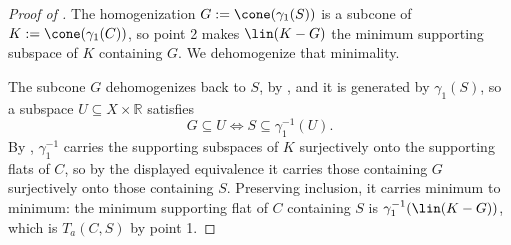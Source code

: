 \documentclass{article}
\theoremstyle{plain}
\theoremstyle{definition}
\theoremstyle{remark}
\begin{document}
\begin{proof}[\hypertarget{loc:the_joint_supporting_subspace_is_the_generated_supporting_flat.proof}{}Proof of ]

The homogenization $G := \cone(\gamma_1(S))$ is a subcone of $K := \cone(\gamma_1(C))$, so  point 2 makes $\lin(K-G)$ the minimum supporting subspace of $K$ containing $G$. We dehomogenize that minimality.

The subcone $G$ dehomogenizes back to $S$, by , and it is generated by $\gamma_1(S)$, so a subspace $U \subseteq X \times \mathbb{R}$ satisfies
\begin{equation*}
G \subseteq U \iff S \subseteq \gamma_1^{-1}(U).
\end{equation*}
By , $\gamma_1^{-1}$ carries the supporting subspaces of $K$ surjectively onto the supporting flats of $C$, so by the displayed equivalence it carries those containing $G$ surjectively onto those containing $S$. Preserving inclusion, it carries minimum to minimum: the minimum supporting flat of $C$ containing $S$ is $\gamma_1^{-1}(\lin(K-G))$, which is $T_a(C,S)$ by  point 1.
\end{proof}
\end{document}

